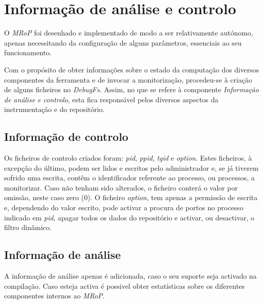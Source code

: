 

\section{Informação de análise e controlo}

O \textit{MRoP} foi desenhado e implementado de modo a ser relativamente autónomo, apenas necessitando da configuração de alguns parâmetros, essenciais ao seu funcionamento.

Com o propósito de obter informações sobre o estado da computação dos diversos componentes da ferramenta e de invocar a monitorização, procedeu-se à criação de alguns ficheiros no \textit{DebugFs}.
Assim, no que se refere à componente \textit{Informação de análise e controlo}, esta fica responsável pelos diversos aspectos da instrumentação e do repositório.

\subsection{Informação de controlo}

Os ficheiros de controlo criados foram: \textit{pid}, \textit{ppid}, \textit{tgid} e \textit{option}.
Estes ficheiros, à excepção do último, podem ser lidos e escritos pelo administrador e, se já tiverem sofrido uma escrita, contêm o identificador referente ao processo, ou processos, a monitorizar.
Caso não tenham sido alterados, o ficheiro conterá o valor por omissão, neste caso zero (0).
O ficheiro \textit{option}, tem apenas a permissão de escrita e, dependendo do valor escrito, pode activar a procura de portos no processo indicado em \textit{pid}, apagar todos os dados do repositório e activar, ou desactivar, o filtro dinâmico.

\subsection{Informação de análise}
A informação de análise apenas é adicionada, caso o seu suporte seja activado na compilação.
Caso esteja activa é possivel obter estatísticas sobre os diferentes componentes internos ao \textit{MRoP}.

